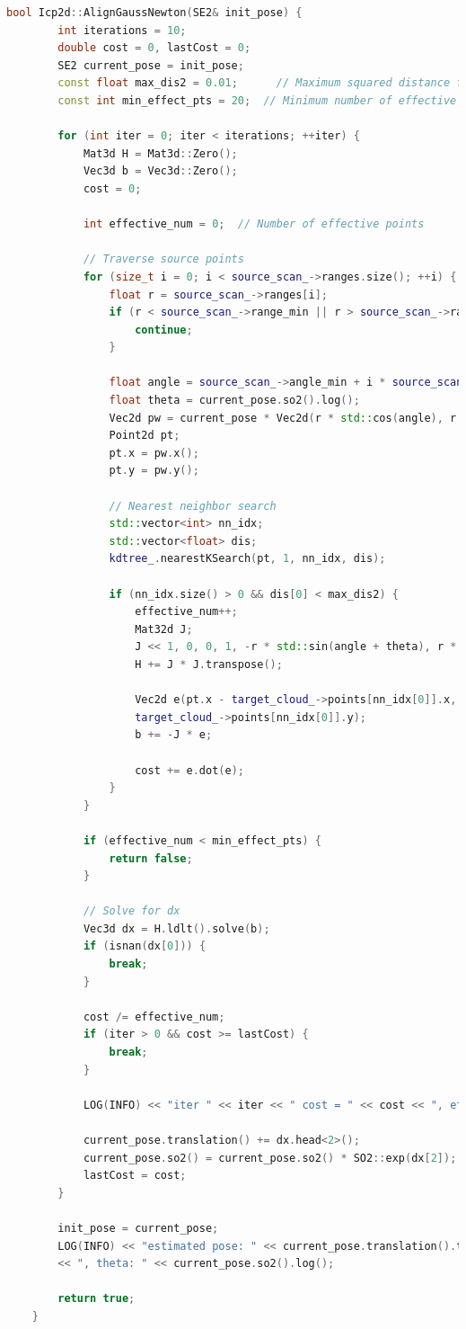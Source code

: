 \begin{lstlisting}[language=c++, caption=src/ch6/icp\_2d.cc]  
	bool Icp2d::AlignGaussNewton(SE2& init_pose) {  
		int iterations = 10;  
		double cost = 0, lastCost = 0;  
		SE2 current_pose = init_pose;  
		const float max_dis2 = 0.01;      // Maximum squared distance for nearest neighbors  
		const int min_effect_pts = 20;  // Minimum number of effective points  
		
		for (int iter = 0; iter < iterations; ++iter) {  
			Mat3d H = Mat3d::Zero();  
			Vec3d b = Vec3d::Zero();  
			cost = 0;  
			
			int effective_num = 0;  // Number of effective points  
			
			// Traverse source points  
			for (size_t i = 0; i < source_scan_->ranges.size(); ++i) {  
				float r = source_scan_->ranges[i];  
				if (r < source_scan_->range_min || r > source_scan_->range_max) {  
					continue;  
				}  
				
				float angle = source_scan_->angle_min + i * source_scan_->angle_increment;  
				float theta = current_pose.so2().log();  
				Vec2d pw = current_pose * Vec2d(r * std::cos(angle), r * std::sin(angle));  
				Point2d pt;  
				pt.x = pw.x();  
				pt.y = pw.y();  
				
				// Nearest neighbor search  
				std::vector<int> nn_idx;  
				std::vector<float> dis;  
				kdtree_.nearestKSearch(pt, 1, nn_idx, dis);  
				
				if (nn_idx.size() > 0 && dis[0] < max_dis2) {  
					effective_num++;  
					Mat32d J;  
					J << 1, 0, 0, 1, -r * std::sin(angle + theta), r * std::cos(angle + theta);  
					H += J * J.transpose();  
					
					Vec2d e(pt.x - target_cloud_->points[nn_idx[0]].x, pt.y -  
					target_cloud_->points[nn_idx[0]].y);  
					b += -J * e;  
					
					cost += e.dot(e);  
				}  
			}  
			
			if (effective_num < min_effect_pts) {  
				return false;  
			}  
			
			// Solve for dx  
			Vec3d dx = H.ldlt().solve(b);  
			if (isnan(dx[0])) {  
				break;  
			}  
			
			cost /= effective_num;  
			if (iter > 0 && cost >= lastCost) {  
				break;  
			}  
			
			LOG(INFO) << "iter " << iter << " cost = " << cost << ", effect num: " << effective_num;  
			
			current_pose.translation() += dx.head<2>();  
			current_pose.so2() = current_pose.so2() * SO2::exp(dx[2]);  
			lastCost = cost;  
		}  
		
		init_pose = current_pose;  
		LOG(INFO) << "estimated pose: " << current_pose.translation().transpose()  
		<< ", theta: " << current_pose.so2().log();  
		
		return true;  
	}  
\end{lstlisting}  

